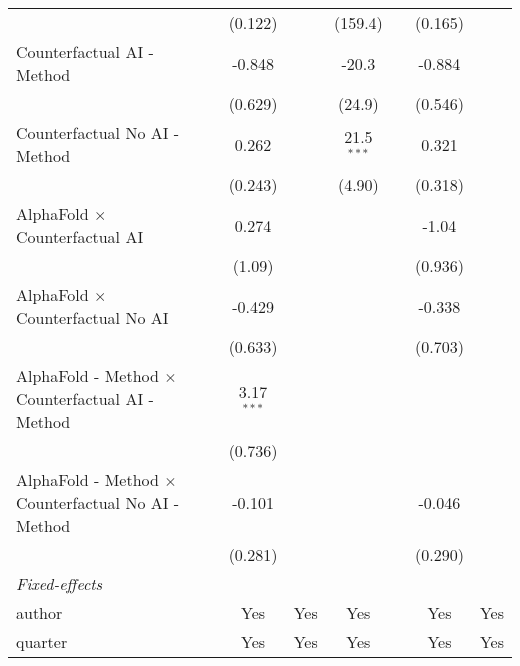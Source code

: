 \begin{tabular}{lcccccc}
                                                              & (0.122)      &               & (159.4)       &      & (0.165) &   \\   
   Counterfactual AI - Method                                 & -0.848       &               & -20.3         &      & -0.884  &   \\   
                                                              & (0.629)      &               & (24.9)        &      & (0.546) &   \\   
   Counterfactual No AI - Method                              & 0.262        &               & 21.5$^{***}$  &      & 0.321   &   \\   
                                                              & (0.243)      &               & (4.90)        &      & (0.318) &   \\   
   AlphaFold $\times$ Counterfactual AI                       & 0.274        &               &               &      & -1.04   &   \\   
                                                              & (1.09)       &               &               &      & (0.936) &   \\   
   AlphaFold $\times$ Counterfactual No AI                    & -0.429       &               &               &      & -0.338  &   \\   
                                                              & (0.633)      &               &               &      & (0.703) &   \\   
   AlphaFold - Method $\times$ Counterfactual AI - Method     & 3.17$^{***}$ &               &               &      &         &   \\   
                                                              & (0.736)      &               &               &      &         &   \\   
   AlphaFold - Method $\times$ Counterfactual No AI - Method  & -0.101       &               &               &      & -0.046  &   \\   
                                                              & (0.281)      &               &               &      & (0.290) &   \\   
   \midrule
   \emph{Fixed-effects}\\
   author                                                     & Yes          & Yes           & Yes           &      & Yes     & Yes\\  
   quarter                                                    & Yes          & Yes           & Yes           &      & Yes     & Yes\\  

\end{tabular}
